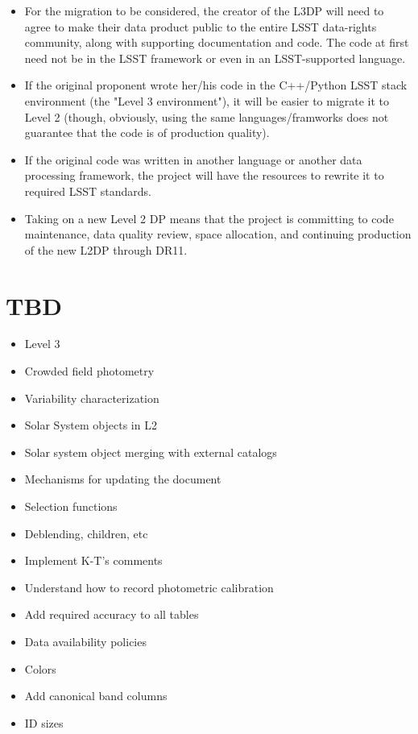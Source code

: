 \documentclass[12pt]{article}
\begin{document}
\begin{itemize}
\item For the migration to be considered, the creator of the L3DP will need to agree to make their data product public to the entire LSST data-rights community, along with supporting documentation and code. The code at first need not be in the LSST framework or even in an LSST-supported language.
\item If the original proponent wrote her/his code in the C++/Python LSST stack environment (the "Level 3 environment"), it will be easier to migrate it to Level 2 (though, obviously, using the same languages/framworks does not guarantee that the code is of production quality).
\item If the original code was written in another language or another data processing framework, the project will have the resources to rewrite it to required LSST standards.
\item Taking on a new Level 2 DP means that the project is committing to code maintenance, data quality review, space allocation, and continuing production of the new L2DP through DR11.
\end{itemize}



\section{TBD}

\begin{itemize}

    \item Level 3
    \item Crowded field photometry
    \item Variability characterization
    \item Solar System objects in L2
    \item Solar system object merging with external catalogs
    \item Mechanisms for updating the document

    \item Selection functions
    \item Deblending, children, etc
    \item Implement K-T's comments
    \item Understand how to record photometric calibration
    \item Add required accuracy to all tables

    \item Data availability policies
    \item Colors
    \item Add canonical band columns
    \item ID sizes

\end{itemize}
\end{document}
